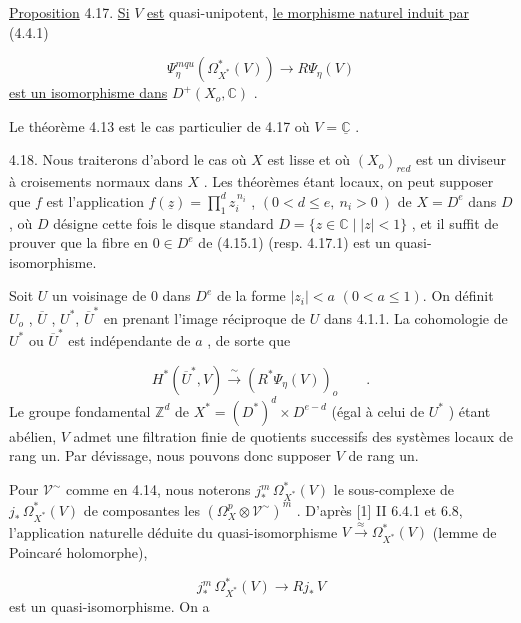 \underline{Proposition} 4.17. \underline{Si} $V$ \underline{est} quasi-unipotent, \underline{le morphisme naturel induit par} (4.4.1)

\begin{equation}\tag{4.17.1}
\Psi^{mqu}_\eta(\Omega^*_{X^*}(V)) \longrightarrow R\Psi_\eta(V)
\end{equation}
\underline{est un isomorphisme dans} $D^+(X_o, \mathbb{C})$ .



Le théorème 4.13 est le cas particulier de 4.17 où $V = \underline{\mathbb{C}}$ .

4.18. Nous traiterons d'abord le cas où $X$ est lisse et où $(X_o)_{red}$ est un diviseur à croisements normaux dans $X$ . Les théorèmes étant locaux, on peut supposer que $f$ est l'application $f(\underline{z}) = \prod_1^d z_i^{\,n_i}$ , $(0 < d \leqslant e,\ n_i > 0\ )$ de $X = D^e$ dans $D$ , où $D$ désigne cette fois le disque standard $D = \{z \in \mathbb{C} \mid |z| < 1\}$ , et il suffit de prouver que la fibre en $0 \in D^e$ de (4.15.1) (resp. 4.17.1) est un quasi-isomorphisme.

Soit $U$ un voisinage de $0$ dans $D^e$ de la forme $|z_i| < a$ $(0 < a \leqslant 1)$. On définit $U_o$ , $\overline{U}$ , $U^*$, $\overline{U}^*$ en prenant l'image réciproque de $U$ dans 4.1.1. La cohomologie de $U^*$ ou $\overline{U}^*$ est indépendante de $a$ , de sorte que

\begin{equation*}
H^*(\overline{U}^*, V) \xrightarrow{\ \sim\ } (R^* \Psi_\eta(V))_o \qquad .
\end{equation*}
Le groupe fondamental $\mathbb{Z}^d$ de $X^* = (D^*)^d \times D^{e-d}$ (égal à celui de $U^*$ ) étant abélien, $V$ admet une filtration finie de quotients successifs des systèmes locaux de rang un. Par dévissage, nous pouvons donc supposer $V$ de rang un.

Pour $\mathcal{V}^\sim$ comme en 4.14, nous noterons $j_*^m\, \Omega^*_{X^*}(V)$ le sous-complexe de $j_*\, \Omega^*_{X^*}(V)$ de composantes les $(\Omega^p_X \otimes \mathcal{V}^\sim)^m$ . D'après [1] II 6.4.1 et 6.8, l'application naturelle déduite du quasi-isomorphisme $V \xrightarrow{\ \approx\ } \Omega^*_{X^*}(V)$ (lemme de Poincaré holomorphe),

\begin{equation}\tag{4.18.1}
j_*^m\, \Omega^*_{X^*}(V) \longrightarrow Rj_*\, V
\end{equation}
est un quasi-isomorphisme. On a


